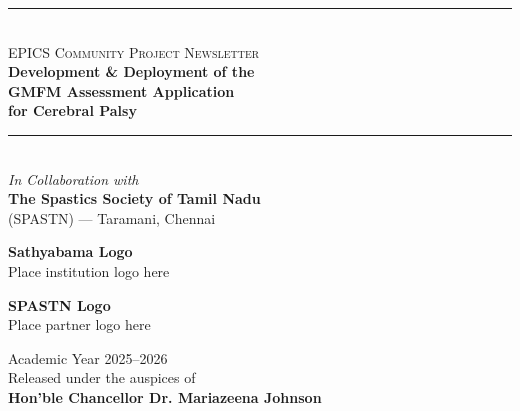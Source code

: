 \documentclass[11pt,a4paper]{article}
\begin{document}
\begin{center}
    {\color{sathyamaruby}\rule{0.25\textwidth}{1pt}}\\[0.5cm]
    {\small\color{warmgray}\textsc{EPICS Community Project Newsletter}}\\[0.8cm]
    {\Huge\bfseries\color{deepnavy} Development \& Deployment of the}\\[0.3cm]
    {\Huge\bfseries\color{deepnavy} GMFM Assessment Application}\\[0.3cm]
    {\Huge\bfseries\color{deepnavy} for Cerebral Palsy}\\[0.8cm]
    {\color{sathyamaruby}\rule{0.25\textwidth}{1pt}}\\[1cm]

    {\large\color{warmgray}\textit{In Collaboration with}}\\[0.4cm]
    {\LARGE\bfseries\color{clinicalteal} The Spastics Society of Tamil Nadu}\\[0.15cm]
    {\normalsize\color{warmgray} (SPASTN) --- Taramani, Chennai}\\[1.5cm]

    \begin{minipage}{0.35\textwidth}
        \centering
        \begin{photoplaceholder}[height=3.5cm]
            \vspace{1cm}
            {\normalsize\bfseries Sathyabama Logo}\\[0.2cm]
            {\footnotesize Place institution logo here}
        \end{photoplaceholder}
    \end{minipage}
    \hspace{2cm}
    \begin{minipage}{0.35\textwidth}
        \centering
        \begin{photoplaceholder}[height=3.5cm]
            \vspace{1cm}
            {\normalsize\bfseries SPASTN Logo}\\[0.2cm]
            {\footnotesize Place partner logo here}
        \end{photoplaceholder}
    \end{minipage}

    \vspace{1cm}

    {\normalsize\color{warmgray} Academic Year 2025--2026}\\[0.2cm]
    {\small\color{warmgray} Released under the auspices of}\\[0.15cm]
    {\normalsize\bfseries\color{sathyamaruby} Hon'ble Chancellor Dr. Mariazeena Johnson}
\end{center}
\end{document}
